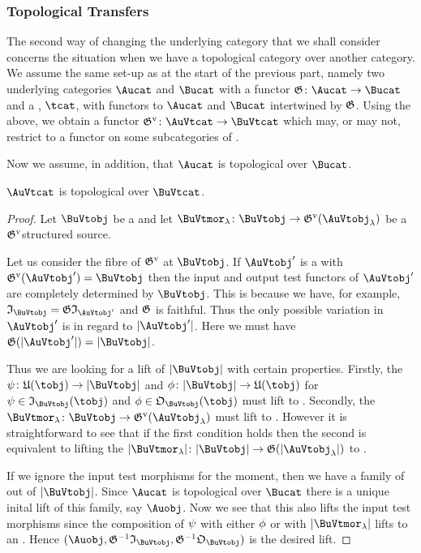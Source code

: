 \documentclass[%
12pt,%
arxiv,%
defaults
]{myclass}
\begin{document}
\subsubsection{Topological Transfers}

The second way of changing the underlying category that we shall consider concerns the situation when we have a topological category over another category.
We assume the same set\hyp{}up as at the start of the previous part, namely two underlying categories \(\Aucat\) and \(\Bucat\) with a functor \(\subfunc \colon \Aucat \to \Bucat\) and a \tcat, \(\tcat\), with functors to \(\Aucat\) and \(\Bucat\) intertwined by \(\subfunc\).
Using the above, we obtain a functor \(\mVo{\subfunc} \colon \AuVtcat \to \BuVtcat\) which may, or may not, restrict to a functor on some subcategories of \uFVtobjs.

Now we assume, in addition, that \(\Aucat\) is topological over \(\Bucat\).

\begin{lemma}
\(\AuVtcat\) is topological over \(\BuVtcat\).
\end{lemma}

\begin{proof}
Let \(\BuVtobj\) be a \BuVtobj and let \(\BuVtmor_\lambda \colon \BuVtobj \to \mVo{\subfunc}(\AuVtobj_\lambda)\) be a \(\mVo{\subfunc}\)\enhyp{}structured source.

Let us consider the fibre of \(\mVo{\subfunc}\) at \(\BuVtobj\).
If \(\AuVtobj'\) is a \AuVtobj with \(\mVo{\subfunc}(\AuVtobj') = \BuVtobj\) then the input and output test functors of \(\AuVtobj'\) are completely determined by \(\BuVtobj\).
This is because we have, for example, \(\itest_{\BuVtobj} = \subfunc\itest_{\AuVtobj'}\) and \(\subfunc\) is faithful.
Thus the only possible variation in \(\AuVtobj'\) is in regard to \(\sabs{\AuVtobj'}\).
Here we must have \(\subfunc(\sabs{\AuVtobj'}) = \sabs{\BuVtobj}\).

Thus we are looking for a lift of \(\sabs{\BuVtobj}\) with certain properties.
Firstly, the \Bumors \(\ifn \colon \ufunc(\tobj) \to \sabs{\BuVtobj}\) and \(\ofn \colon \sabs{\BuVtobj} \to \ufunc(\tobj)\) for \(\ifn \in \itest_{\BuVtobj}(\tobj)\) and \(\ofn \in \otest_{\BuVtobj}(\tobj)\) must lift to \Aumors.
Secondly, the \BuVtmors \(\BuVtmor_\lambda \colon \BuVtobj \to \mVo{\subfunc}(\AuVtobj_\lambda)\) must lift to \AuVtmors.
However it is straightforward to see that if the first condition holds then the second is equivalent to lifting the \Bumors \(\sabs{\BuVtmor_\lambda} \colon \sabs{\BuVtobj} \to \subfunc(\sabs{\AuVtobj_\lambda})\) to \Aumors.

If we ignore the input test morphisms for the moment, then we have a family of \Bumors out of \(\sabs{\BuVtobj}\).
Since \(\Aucat\) is topological over \(\Bucat\) there is a unique inital lift of this family, say \(\Auobj\).
Now we see that this also lifts the input test morphisms since the composition of \(\psi\) with either \(\phi\) or with \(\sabs{\BuVtmor_\lambda}\) lifts to an \Aumor.
Hence \((\Auobj, \subfunc^{-1}\itest_{\BuVtobj}, \subfunc^{-1}\otest_{\BuVtobj})\) is the desired lift.
\end{proof}
\end{document}
